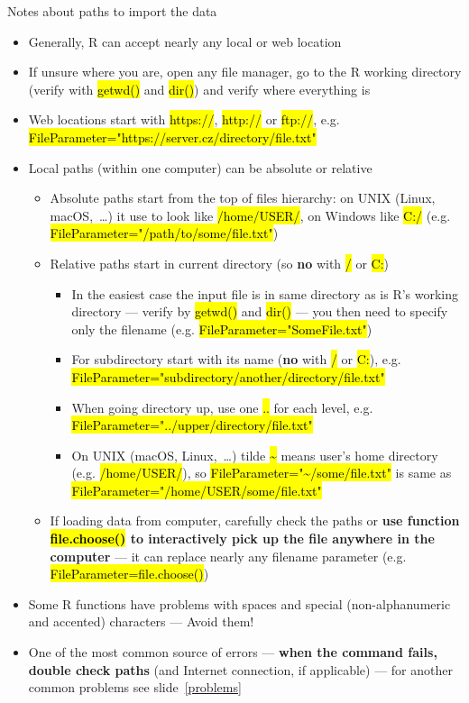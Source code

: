 \documentclass[compress, ucs, xelatex, 11pt, xcolor=svgnames,
	hyperref={
		bookmarks=true,
		unicode=true,
		colorlinks=true,
		pdftitle={Molecular data in R},
		plainpages=false,
		pdfauthor={Vojtech Zeisek},
		pdfsubject={Course about phylogeny and evolution in R},
		pdfcreator={XeLaTeX},
		pdfkeywords={R, evolution, phylogeny, molecular data},
		linkcolor=Tomato,
		anchorcolor=SaddleBrown,
		citecolor=Goldenrod,
		filecolor=DarkMagenta,
		menucolor=Sienna,
		urlcolor=DarkTurquoise,
		pdftex},
	url={hyphens, lowtilde} %
	]{beamer}
\renewcommand{\texttt}[1]{\hl{\ttfamily #1}}
\begin{document}
\begin{frame}[allowframebreaks]{Notes about paths to import the data}
	\label{path}
	\begin{itemize}
		\item Generally, R can accept nearly any local or web location
		\item If unsure where you are, open any file manager, go to the R working directory (verify with \texttt{getwd()} and \texttt{dir()}) and verify where everything is
		\item Web locations start with \texttt{https://}, \texttt{http://} or \texttt{ftp://}, e.g. \texttt{FileParameter="https://server.cz/directory/file.txt"}
		\item Local paths (within one computer) can be absolute or relative
		\begin{itemize}
			\item Absolute paths start from the top of files hierarchy: on UNIX (Linux, macOS,~\ldots) it use to look like \texttt{/home/USER/}, on Windows like \texttt{C:/} (e.g. \texttt{FileParameter="/path/to/some/file.txt"})
			\item Relative paths start in current directory (so \textbf{no} with \texttt{/} or \texttt{C:})
			\begin{itemize}
	\item In the easiest case the input file is in same directory as is R's working directory --- verify by \texttt{getwd()} and \texttt{dir()} --- you then need to specify only the filename (e.g. \texttt{FileParameter="SomeFile.txt"})
	\item For subdirectory start with its name (\textbf{no} with \texttt{/} or \texttt{C:}), e.g. \texttt{FileParameter="subdirectory/another/directory/file.txt"}
	\item When going directory up, use one \texttt{..} for each level, e.g. \texttt{FileParameter="../upper/directory/file.txt"}
	\item On UNIX (macOS, Linux,~\ldots) tilde \texttt{\textasciitilde} means user's home directory (e.g. \texttt{/home/USER/}), so \texttt{FileParameter="\textasciitilde/some/file.txt"} is same as \texttt{FileParameter="/home/USER/some/file.txt"}
			\end{itemize}
			\item If loading data from computer, carefully check the paths or \textbf{use function \texttt{file.choose()} to interactively pick up the file anywhere in the computer} --- it can replace nearly any filename parameter (e.g. \alert{\texttt{FileParameter=file.choose()}})
		\end{itemize}
		\item Some R functions have problems with spaces and special (non-alphanumeric and accented) characters --- Avoid them!
		\item One of the most common source of errors --- \textbf{when the command fails, double check paths} (and Internet connection, if applicable) --- for another common problems see slide~\ref{problems}
	\end{itemize}
\end{frame}
\end{document}
